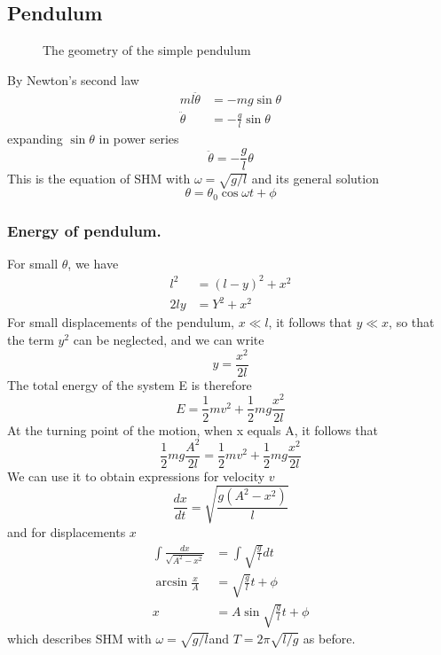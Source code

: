 \documentclass[../../../main.tex]{subfiles}
\begin{document}
\subsection{Pendulum}
\begin{figure}[b]
    \centering
    \caption*{The geometry of the simple pendulum}
\end{figure}
By Newton's second law 
\begin{align*}
    ml\ddot{\theta}&=-mg\sin\theta\\
\ddot{\theta}&=-\frac{g}{l}\sin \theta
\end{align*}
expanding $\sin\theta $ in power series
\begin{equation*}
    \ddot{\theta}=-\frac{g}{l}\theta
\end{equation*}
This is the equation of SHM with $ \omega=\sqrt{g/ l}$ and its general solution 
\begin{equation*}
    \theta=\theta_0 \cos \omega t +\phi
\end{equation*}

\subsubsection{Energy of pendulum.} For small $\theta$, we have
\begin{align*}
    l^2& = (l - y)^2 + x^2\\
    2ly&=Y^2+x^2
\end{align*}
For small displacements of the pendulum, $x\ll l $, it follows that $ y \ll x$, so that the term $y^2$ can be neglected, and we can write
\begin{equation*}
    y=\frac{x^2}{2l}
\end{equation*}
The total energy of the system E is therefore\begin{equation*}
    E=\frac{1}{2}mv^2+\frac{1}{2}mg\frac{x^2}{2l}
\end{equation*}
At the turning point of the motion, when x equals A, it follows that
\begin{equation*}
    \frac{1}{2}mg\frac{A^2}{2l}=\frac{1}{2}mv^2+\frac{1}{2}mg\frac{x^2}{2l}
\end{equation*}
We can use it to obtain expressions for velocity $v$ 
\begin{equation*}
    \frac{dx}{dt}=\sqrt{\frac{g(A^2-x^2)}{l}}
\end{equation*}
and for displacements $x$
\begin{align*}
    \int \frac{dx}{\sqrt{A^2-x^2}}&=\int \sqrt{\frac{g}{l}}dt\\
    \arcsin \frac{x}{A}&= \sqrt{\frac{g}{l}}t+\phi\\
    x&=A\sin \sqrt{\frac{g}{l}}t+\phi
\end{align*}
which describes SHM with $\omega = \sqrt{g/ l} $and $T = 2\pi \sqrt{l/g}$ as before.
\end{document}
